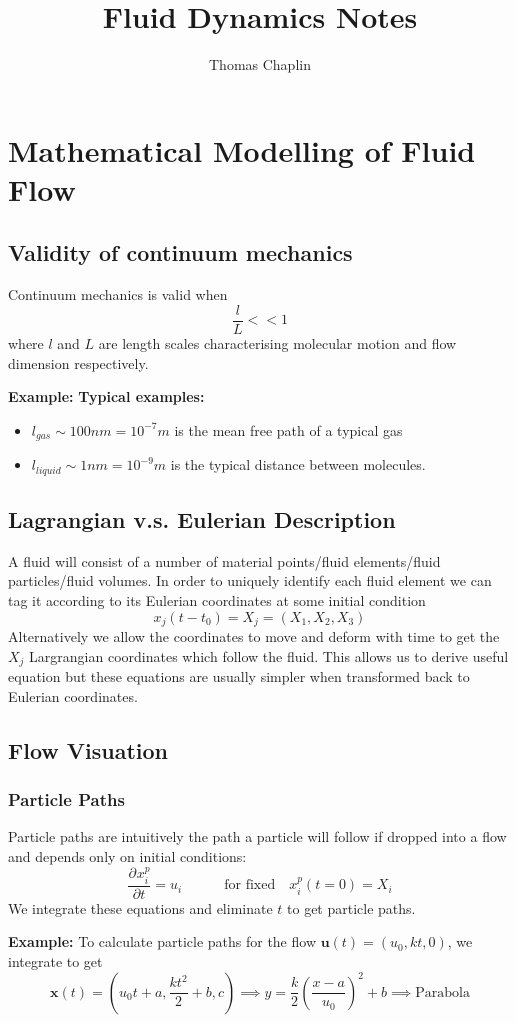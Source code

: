 \documentclass[11pt]{article}
\title{Fluid Dynamics Notes}
\author{Thomas Chaplin}
\date{}
\newcommand*{\pd}[3][]{\ensuremath{\frac{\partial^{#1} {#2}}{\partial {#3}^{#1}}}}
\newcommand{\mv}[1]{\bm{#1}}
\newenvironment{eg}
{\begin{mdframed}[backgroundcolor=mylg, roundcorner=5pt, linewidth=0pt]\textbf{Example: }\normalfont}
    {\end{mdframed}}
\begin{document}
\maketitle

\section{Mathematical Modelling of Fluid Flow}
\subsection{Validity of continuum mechanics}
Continuum mechanics is valid when
$$\frac{l}{L}<<1$$
where $l$ and $L$ are length scales characterising molecular motion and flow dimension respectively.
\begin{eg}
\textbf{Typical examples:}
\begin{itemize}
    \item $l_{gas}\sim 100nm=10^{-7}m$ is the mean free path of a typical gas
    \item $l_{liquid}\sim 1nm=10^{-9}m$ is the typical distance between molecules.
\end{itemize}
\end{eg}

\subsection{Lagrangian v.s. Eulerian Description}
A fluid will consist of a number of material points/fluid elements/fluid particles/fluid volumes.
In order to uniquely identify each fluid element we can tag it according to its Eulerian coordinates at some initial condition
$$x_j(t-t_0)=X_j=(X_1,X_2,X_3)$$
Alternatively we allow the coordinates to move and deform with time to get the $X_j$ Largrangian coordinates which follow the fluid.
This allows us to derive useful equation but these equations are usually simpler when transformed back to Eulerian coordinates.

\subsection{Flow Visuation}
\subsubsection{Particle Paths}
Particle paths are intuitively the path a particle will follow if dropped into a flow and depends only on initial conditions:
$$\pd{x_i^p}{t}=u_i \quad\quad\quad \text{for fixed} \quad x_i^p(t=0)=X_i$$
We integrate these equations and eliminate $t$ to get particle paths.
\begin{eg}
To calculate particle paths for the flow $\mv{u}(t)=(u_0,kt,0)$, we integrate to get
$$\mv{x}(t)=(u_0t+a,\frac{kt^2}{2}+b,c)\implies y=\frac{k}{2}\left(\frac{x-a}{u_0}\right)^2+b\implies\text{Parabola}$$
\end{eg}
\end{document}
